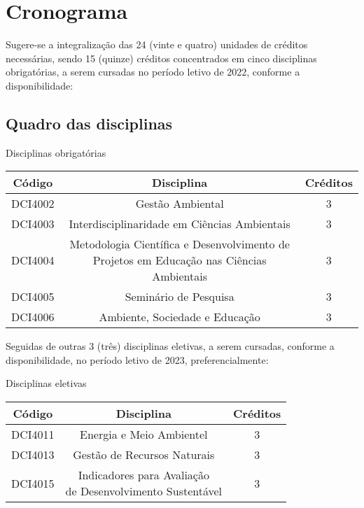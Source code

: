 \documentclass[
  12pt,       %
  openright,      %
  twoside,      %
  a4paper,      %
  english,      %
  french,       %
  spanish,      %
  brazil        %
  ]{abntex2}
\begin{document}
\chapter{Cronograma}

Sugere-se a integralização das 24 (vinte e quatro) unidades de créditos necessárias, sendo 15 (quinze) créditos concentrados em cinco disciplinas obrigatórias, a serem cursadas no período letivo de 2022, conforme a disponibilidade: 

\section{Quadro das disciplinas}

\begin{quadro}
\caption{\label{Disciplinas obrigatórias}Disciplinas obrigatórias}
\begin{tabular}{|c|c|c|}
  \hline
  \textbf{Código} & \textbf{Disciplina} & \textbf{Créditos} \\ \hline
  DCI4002 & Gestão Ambiental & 3   \\ \hline
  DCI4003 & Interdisciplinaridade em Ciências Ambientais & 3   \\ \hline
  DCI4004 & \makecell{Metodologia Científica e Desenvolvimento de \\
            Projetos em Educação nas Ciências Ambientais}   & 3  \\ \hline
  DCI4005 & Seminário de Pesquisa    & 3   \\ \hline
  DCI4006 & Ambiente, Sociedade e Educação & 3   \\ \hline
\end{tabular}
\end{quadro}


Seguidas de outras 3 (três) disciplinas eletivas, a serem cursadas, conforme a disponibilidade, no período letivo de 2023, preferencialmente:


\begin{quadro}
\caption{\label{Disciplinas eletivas}Disciplinas eletivas}
\begin{tabular}{|c|c|c|}
  \hline
  \textbf{Código} & \textbf{Disciplina} & \textbf{Créditos} \\ \hline
  DCI4011 & Energia e Meio Ambientel & 3   \\ \hline
  DCI4013 & Gestão de Recursos Naturais & 3   \\ \hline
  DCI4015 & \makecell{Indicadores para Avaliação\\ de Desenvolvimento Sustentável}   & 3  \\ \hline
\end{tabular}
\end{quadro}
\end{document}
